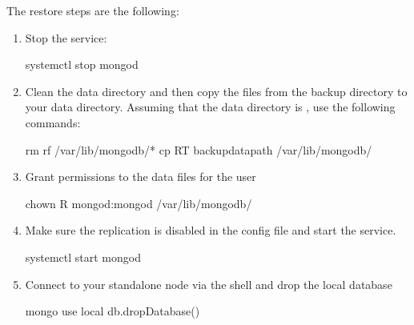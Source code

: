\documentclass[letterpaper,10pt,english]{sphinxmanual}
\begin{document}
\sphinxAtStartPar
The restore steps are the following:
\begin{enumerate}
%
\item {} 
\sphinxAtStartPar
Stop the  service:

\begin{sphinxVerbatim}[commandchars=\\\{\}]
\PYGZdl{} systemctl stop mongod
\end{sphinxVerbatim}

\item {} 
\sphinxAtStartPar
Clean the data directory and then copy the files from the backup directory to your data directory. Assuming that the data directory is , use the following commands:

\begin{sphinxVerbatim}[commandchars=\\\{\}]
\PYGZdl{} rm \PYGZhy{}rf /var/lib/mongodb/*
\PYGZdl{} cp \PYGZhy{}RT \PYGZlt{}backup\PYGZus{}data\PYGZus{}path\PYGZgt{} /var/lib/mongodb/
\end{sphinxVerbatim}

\item {} 
\sphinxAtStartPar
Grant permissions to the data files for the  user

\begin{sphinxVerbatim}[commandchars=\\\{\}]
\PYGZdl{} chown \PYGZhy{}R mongod:mongod /var/lib/mongodb/
\end{sphinxVerbatim}

\item {} 
\sphinxAtStartPar
Make sure the replication is disabled in the config file and start the  service.

\begin{sphinxVerbatim}[commandchars=\\\{\}]
\PYGZdl{} systemctl start mongod
\end{sphinxVerbatim}

\item {} 
\sphinxAtStartPar
Connect to your standalone node via the  shell and drop the local database

\begin{sphinxVerbatim}[commandchars=\\\{\}]
\PYGZgt{} mongo
\PYGZgt{} use local
\PYGZgt{} db.dropDatabase()
\end{sphinxVerbatim}


\end{enumerate}
\end{document}
